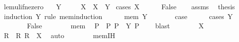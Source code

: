 \begin{isabellebody}
%
\isatagdocument
%
\isamarkuptrue%
%
\endisatagdocument
{\isafolddocument}%
%
\isadelimdocument
%
\endisadelimdocument
{}\isamarkupfalse%
\ le{\isacharunderscore}{\kern0pt}mul{\isacharunderscore}{\kern0pt}if{\isacharunderscore}{\kern0pt}ne{\isacharunderscore}{\kern0pt}zero{\isacharcolon}{\kern0pt}\isanewline
\ \ \ {\isachardoublequoteopen}Y\ {\isasymnoteq}\ {}{\isachardoublequoteclose}\isanewline
\ \ \ {\isachardoublequoteopen}X\ {\isasymle}\ X\ {\isacharasterisk}{\kern0pt}\ Y{\isachardoublequoteclose}\isanewline
%
\isadelimproof
%
\endisadelimproof
%
\isatagproof
{}\isamarkupfalse%
\ {\isacharparenleft}{\kern0pt}cases\ {\isachardoublequoteopen}X\ {\isacharequal}{\kern0pt}\ {}{\isachardoublequoteclose}{\isacharparenright}{\kern0pt}\isanewline
\ \ \isamarkupfalse%
\ False\isanewline
\ \ \isamarkupfalse%
\ assms\ \isamarkupfalse%
\ {\isacharquery}{\kern0pt}thesis\isanewline
\ \ \isamarkupfalse%
\ {\isacharparenleft}{\kern0pt}induction\ Y\ rule{\isacharcolon}{\kern0pt}\ mem{\isacharunderscore}{\kern0pt}induction{\isacharparenright}{\kern0pt}\isanewline
\ \ \ \ \isamarkupfalse%
\ {\isacharparenleft}{\kern0pt}mem\ Y{\isacharparenright}{\kern0pt}\isanewline
\ \ \ \ \isamarkupfalse%
\ \isamarkupfalse%
\ {\isacharquery}{\kern0pt}case\isanewline
\ \ \ \ \isamarkupfalse%
\ {\isacharparenleft}{\kern0pt}cases\ {\isachardoublequoteopen}Y\ {\isacharequal}{\kern0pt}\ {}{\isachardoublequoteclose}{\isacharparenright}{\kern0pt}\isanewline
\ \ \ \ \ \ \isamarkupfalse%
\ False\isanewline
\ \ \ \ \ \ \isamarkupfalse%
\ mem\ \isamarkupfalse%
\ P\ \ P{\isacharcolon}{\kern0pt}\ {\isachardoublequoteopen}P\ {\isasymin}\ Y{\isachardoublequoteclose}\ {\isachardoublequoteopen}P\ {\isasymnoteq}\ {}{\isachardoublequoteclose}\ \isamarkupfalse%
\ blast\isanewline
\ \ \ \ \ \ \isamarkupfalse%
\ {\isacartoucheopen}X\ {\isasymnoteq}\ {}{\isacartoucheclose}\ \isamarkupfalse%
\ R\ \ R{\isacharcolon}{\kern0pt}\ {\isachardoublequoteopen}R\ {\isasymin}\ X{\isachardoublequoteclose}\ \isamarkupfalse%
\ auto\isanewline
\ \ \ \ \ \ \isamarkupfalse%
\ mem{\isachardot}{\kern0pt}IH\ \isamarkupfalse%

\end{isabellebody}

